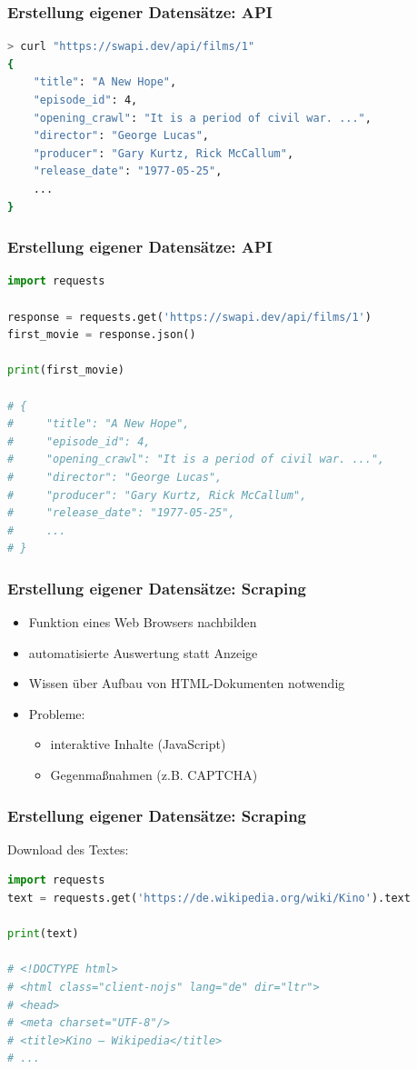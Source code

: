 \begin{frame}[fragile]
	\frametitle{Erstellung eigener Datensätze: API}
	
	\begin{lstlisting}[language=bash]
> curl "https://swapi.dev/api/films/1"
{
    "title": "A New Hope",
    "episode_id": 4,
    "opening_crawl": "It is a period of civil war. ...",
    "director": "George Lucas",
    "producer": "Gary Kurtz, Rick McCallum",
    "release_date": "1977-05-25",
    ...
}\end{lstlisting}
\end{frame}

\begin{frame}[fragile]
	\frametitle{Erstellung eigener Datensätze: API}
	
	\begin{lstlisting}[language=Python]
import requests

response = requests.get('https://swapi.dev/api/films/1')
first_movie = response.json()

print(first_movie)

# {
#     "title": "A New Hope",
#     "episode_id": 4,
#     "opening_crawl": "It is a period of civil war. ...",
#     "director": "George Lucas",
#     "producer": "Gary Kurtz, Rick McCallum",
#     "release_date": "1977-05-25",
#     ...
# }\end{lstlisting}
\end{frame}

\begin{frame}
	\frametitle{Erstellung eigener Datensätze: Scraping}
	
	\begin{itemize}
		\item Funktion eines Web Browsers nachbilden
		\item automatisierte Auswertung statt Anzeige
		\item Wissen über Aufbau von HTML-Dokumenten notwendig
		\item Probleme:
		\begin{itemize}
			\item interaktive Inhalte (JavaScript)
			\item Gegenmaßnahmen (z.B. CAPTCHA)
		\end{itemize}
	\end{itemize}
\end{frame}

\begin{frame}[fragile]
	\frametitle{Erstellung eigener Datensätze: Scraping}
	
	Download des Textes:

	\begin{lstlisting}[language=Python]
import requests
text = requests.get('https://de.wikipedia.org/wiki/Kino').text

print(text)

# <!DOCTYPE html>
# <html class="client-nojs" lang="de" dir="ltr">
# <head>
# <meta charset="UTF-8"/>
# <title>Kino – Wikipedia</title>
# ...\end{lstlisting}
\end{frame}


